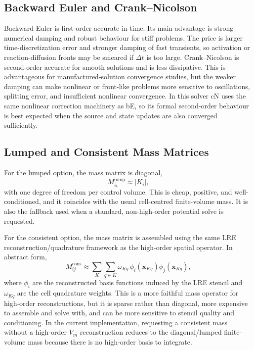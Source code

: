 \documentclass[11pt,a4paper]{article}
\begin{document}
\subsection{Backward Euler and Crank--Nicolson}
Backward Euler is first-order accurate in time. Its main advantage is strong
numerical damping and robust behaviour for stiff problems. The price is larger
time-discretization error and stronger damping of fast transients, so activation
or reaction-diffusion fronts may be smeared if $\Delta t$ is too large.
Crank--Nicolson is second-order accurate for smooth solutions and is less
dissipative. This is advantageous for manufactured-solution convergence studies,
but the weaker damping can make nonlinear or front-like problems more sensitive
to oscillations, splitting error, and insufficient nonlinear convergence. In this
solver cN uses the same nonlinear correction machinery as bE, so its formal
second-order behaviour is best expected when the source and state updates are
also converged sufficiently.

\subsection{Lumped and Consistent Mass Matrices}
For the lumped option, the mass matrix is diagonal,
\begin{equation}
M^{\mathrm{lump}}_{ii} \approx |K_i|,
\end{equation}
with one degree of freedom per control volume. This is cheap, positive, and
well-conditioned, and it coincides with the usual cell-centred finite-volume
mass. It is also the fallback used when a standard, non-high-order potential
solve is requested.

For the consistent option, the mass matrix is assembled using the same LRE
reconstruction/quadrature framework as the high-order spatial operator. In
abstract form,
\begin{equation}
M^{\mathrm{cons}}_{ij}
\approx \sum_{K}\sum_{q\in K} \omega_{Kq}\,
\phi_i(\mathbf{x}_{Kq})\phi_j(\mathbf{x}_{Kq}),
\end{equation}
where $\phi_i$ are the reconstructed basis functions induced by the LRE stencil
and $\omega_{Kq}$ are the cell quadrature weights. This is a more faithful mass
operator for high-order reconstructions, but it is sparse rather than diagonal,
more expensive to assemble and solve with, and can be more sensitive to stencil
quality and conditioning. In the current implementation, requesting a consistent
mass without a high-order $V_m$ reconstruction reduces to the diagonal/lumped
finite-volume mass because there is no high-order basis to integrate.
\end{document}
